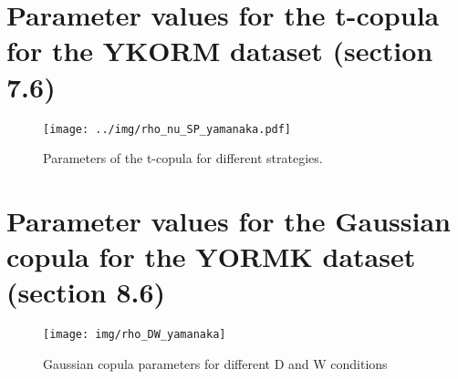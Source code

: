 \documentclass{article}
\begin{document}


\section{Parameter values for the t-copula for the YKORM dataset (section 7.6)}
\begin{figure}[htbp]
	\centering
	\texttt{[image: ../img/rho\_nu\_SP\_yamanaka.pdf]}
	\caption{Parameters of the t-copula for different strategies.}
	\label{fig:rho_nu}
\end{figure}


\section{Parameter values for the Gaussian copula for the YORMK dataset (section 8.6)}

\begin{figure}[htbp]
    \centering
    \texttt{[image: img/rho\_DW\_yamanaka]}
    \caption{Gaussian copula parameters for different D and W conditions}
    \label{fig:rho_DW}
\end{figure}
\end{document}
